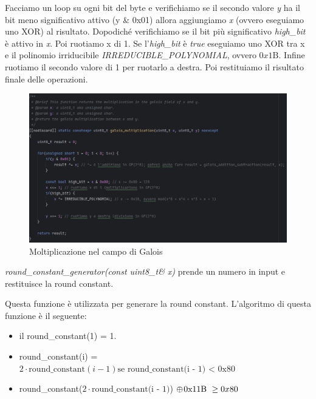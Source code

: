 
\textsf{\small Facciamo un loop su ogni bit del byte e verifichiamo se il secondo valore \emph{y} ha il bit meno significativo attivo (y \& 0x01) allora aggiungiamo \emph{x} (ovvero eseguiamo uno XOR) al risultato. Dopodiché verifichiamo se il bit più significativo \emph{high\_bit} è attivo in \emph{x}. Poi ruotiamo x di 1. Se l'\emph{high\_bit} è \emph{true} eseguiamo uno XOR tra x e il polinomio irriducibile \emph{IRREDUCIBLE\_POLYNOMIAL}, ovvero $0x1\text{B}$. Infine ruotiamo il secondo valore di 1 per ruotarlo a destra. Poi restituiamo il risultato finale delle operazioni.}

\begin{figure}[H]
	\centering
	\includegraphics[width=1\textwidth, height=1\textheight, keepaspectratio]{./images/code/cpp/galois_math/galois_multiplication.PNG}
	\caption{Moltiplicazione nel campo di Galois}
	\label{fig:galois_multiplication}
\end{figure}

\textsf{\small \emph{round\_constant\_generator(const uint8\_t\& x)} prende un numero in input e restituisce la round constant.} %

\textsf{\small Questa funzione è utilizzata per generare la round constant.}
\textsf{\small L'algoritmo di questa funzione è il seguente: }

\begin{itemize}
	\item \textsf{\small il round\_constant(1) = 1.}
	\item \textsf{\small round\_constant(i) = $2 \cdot \text{round\_constant}(i - 1) \text{se round\_constant(i - 1) < 0x80}$}
	\item \textsf{\small round\_constant($2 \cdot \text{round\_constant(i - 1)}$) $ \oplus \hspace{0.3mm} \text{0x11B } \ge 0x80$ }
\end{itemize}


